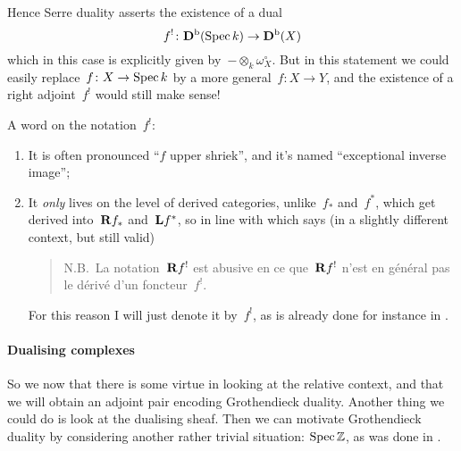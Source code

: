 \documentclass[10pt,a4paper]{article}
\begin{document}
Hence Serre duality asserts the existence of a dual
\begin{equation}
  f^!\colon\mathbf{D}^{\mathrm{b}}(\operatorname{Spec} k)\to\mathbf{D}^{\mathrm{b}}(X)
\end{equation}
which in this case is explicitly given by~$-\otimes_k\omega_X^\circ$. But in this statement we could easily replace~$f\colon X\to\operatorname{Spec} k$ by a more general~$f\colon X\to Y$, and the existence of a right adjoint~$f^!$ would still make sense!

A word on the notation~$f^!$:
\begin{enumerate}
  \item It is often pronounced ``$f$ upper shriek'', and it's named ``exceptional inverse image'';
  \item It \emph{only} lives on the level of derived categories, unlike~$f_*$ and~$f^*$, which get derived into~$\mathbf{R} f_*$ and~$\mathbf{L} f^*$, so in line with \cite[\S 3.1, \'expos\'e XVIII]{sga43} which says (in a slightly different context, but still valid)
    \begin{quote}
      N.B.\ La notation~$\mathbf{R} f^!$ est abusive en ce que~$\mathbf{R} f^!$ n'est en g\'en\'eral pas le d\'eriv\'e d'un foncteur~$f^!$.
    \end{quote}
    For this reason I will just denote it by~$f^!$, as is already done for instance in \cite{hartshorne-residues-and-duality}.
\end{enumerate}


\paragraph{Dualising complexes}
So we now that there is some virtue in looking at the relative context, and that we will obtain an adjoint pair encoding Grothendieck duality. Another thing we could do is look at the dualising sheaf. Then we can motivate Grothendieck duality by considering another rather trivial situation: $\operatorname{Spec}\mathbb{Z}$, as was done in \cite[\S V.1]{hartshorne-residues-and-duality}.
\end{document}
